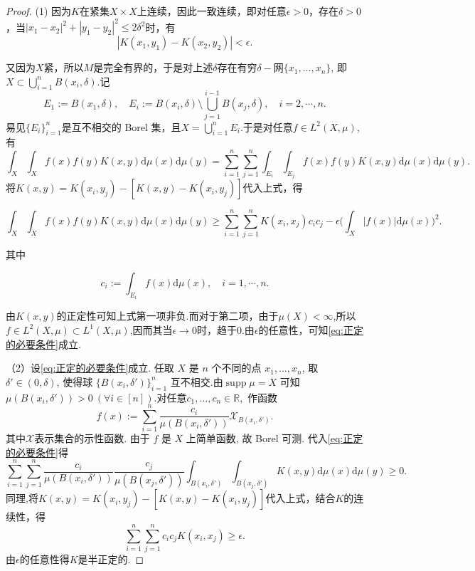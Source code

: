 \documentclass[12pt, a4paper, oneside]{ctexbook}
\begin{document}
\begin{proof}
    (1) 因为$K$在紧集$X\times X$上连续，因此一致连续，即对任意$\epsilon>0$，存在$\delta>0$，当$|x_1-x_2|^2+|y_1-y_2|^2\leq 2\delta^2$时，有
    \begin{equation*}
        |K(x_1,y_1)-K(x_2,y_2)|<\epsilon.
    \end{equation*}
    
    又因为$X$紧，所以$M$是完全有界的，于是对上述$\delta$存在有穷$\delta-$网$\{x_1,\dots,x_n\}$, 即$X\subset\bigcup _{i=1}^n B(x_i,\delta)$.记
    \begin{equation*}
        E_1:=B(x_1,\delta),\quad E_i:=B(x_i,\delta)\setminus\bigcup_{j=1}^{i-1}B(x_j,\delta),\quad i=2,\cdots,n.
    \end{equation*}
    易见$\{E_i\}_{i=1}^n$是互不相交的 Borel 集，且$X=\bigcup_{i=1}^nE_i.$于是对任意$f\in L^2(X,\mu)$,有
    \begin{equation*}
\int_X\int_Xf(x)f(y)K(x,y)\mathrm{d}\mu(x)\mathrm{d}\mu(y)=\sum_{i=1}^n\sum_{j=1}^n\int_{E_i}\int_{E_j}f(x)f(y)K(x,y)\mathrm{d}\mu(x)\mathrm{d}\mu(y).
    \end{equation*}
    将$K(x,y)=K(x_{i},y_{j})-[K(x,y)-K(x_{i},y_{j})]$代入上式，得

$$\int_X\int_Xf(x)f(y)K(x,y)\mathrm{d}\mu(x)\mathrm{d}\mu(y)\geq\sum_{i=1}^n\sum_{j=1}^nK(x_i,x_j)c_ic_j-\epsilon\Big(\int_X|f(x)|\mathrm{d}\mu(x)\Big)^2.$$

其中

$$c_i:=\int_{E_i}f(x)\mathrm{d}\mu(x),\quad i=1,\cdots,n.$$

由$K(x,y)$的正定性可知上式第一项非负.而对于第二项，由于$\mu(X)<\infty$,所以
$f\in L^{2}(X,\mu)\subset L^{1}(X,\mu)$,因而其当$\epsilon\to0$时，趋于0.由$\epsilon$的任意性，可知\eqref{eq:正定的必要条件}成立.

（2）设\eqref{eq:正定的必要条件}成立. 任取 $X$ 是 $n$ 个不同的点 $x_1,\dots,x_n$, 取$ \delta'\in (0,\delta)$, 使得球 $\{B(x_i, \delta')\}^{n}_{i=1}$ 互不相交.由$\operatorname{supp}\mu=X$ 可知$\mu(B(x_i,\delta'))>0~(\forall i\in[n])$.对任意$c_1,\dots, c_n \in \mathbb{R},$ 作函数
$$f(x) := \sum^{n}_{i=1} \frac{c_i}{\mu(B(x_i, \delta'))} \mathcal{X}_{B(x_i, \delta')}.$$
其中$\mathcal{X}$表示集合的示性函数. 由于 $f$ 是 $X$ 上简单函数, 故 Borel 可测. 代入\eqref{eq:正定的必要条件}得
\begin{equation}\label{eq:微分中值定理}
    \sum^{n}_{i=1} \sum^{n}_{j=1} \frac{c_i}{\mu(B(x_i, \delta'))} \frac{c_j}{\mu(B(x_j, \delta'))} \int_{B(x_i, \delta')} \int_{B(x_j, \delta')} K(x, y) \mathrm{d}μ(x) \mathrm{d}μ(y) \geq  0.
\end{equation}
同理,将$K(x,y)=K(x_{i},y_{j})-[K(x,y)-K(x_{i},y_{j})]$代入上式，结合$K$的连续性，得
\begin{equation}\label{eq: K的半正定性转}
    \sum^{n}_{i=1} \sum^{n}_{j=1} c_ic_jK(x_i,x_j) \geq  \epsilon.
\end{equation}
由$\epsilon$的任意性得$K$是半正定的.

\end{proof}
\end{document}
